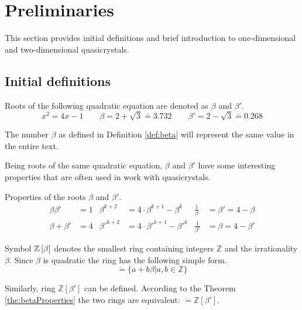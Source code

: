 \documentclass[text.tex]{subfiles}
\begin{document}
\section{Preliminaries}%
This section provides initial definitions and brief introduction to one-dimensional and two-dimensional quasicrystals. 
\subsection{Initial definitions}
\begin{definition}
\label{def:beta}
Roots of the following quadratic equation are denoted as $\beta$ and $\beta'$.
$$x^2=4x-1 \qquad \beta = 2 + \sqrt{3} \doteq 3.732 \qquad \beta' = 2 - \sqrt{3} \doteq 0.268$$
\end{definition}

\begin{remark}
The number $\beta$ as defined in Definition \ref{def:beta} will represent the same value in the entire text.
\end{remark}

Being roots of the same quadratic equation, $\beta$ and $\beta'$ have some interesting properties that are often used in work with quasicrystals. 

\begin{theorem}
\label{the:betaProperties}
Properties of the roots $\beta$ and $\beta'$.
\begin{align*}
\beta\beta' &= 1 &   
\beta^{k+2} &= 4\cdot\beta^{k+1} - \beta^k & 
\frac{1}{\beta} &= \beta' = 4 - \beta \\
\beta + \beta' &= 4 &
{\beta'}^{k+2} &= 4\cdot{\beta'}^{k+1} - {\beta'}^k &
\frac{1}{\beta'} &= \beta = 4 - \beta'
\end{align*}
\end{theorem}

\begin{definition} 
Symbol $\mathbb{Z}\left[\beta\right]$ denotes the smallest ring containing integers $\mathbb{Z}$ and the irrationality $\beta$. Since $\beta$ is quadratic the ring has the following simple form.
$$\ring = \{ a + b\beta |a,b\in \mathbb{Z} \}$$
\end{definition}

\begin{remark}
Similarly, ring $\mathbb{Z}[\beta']$ can be defined. According to the Theorem \ref{the:betaProperties} the two rings are equivalent: $\ring = \mathbb{Z}\left[\beta'\right]$.
\end{remark}
\end{document}
